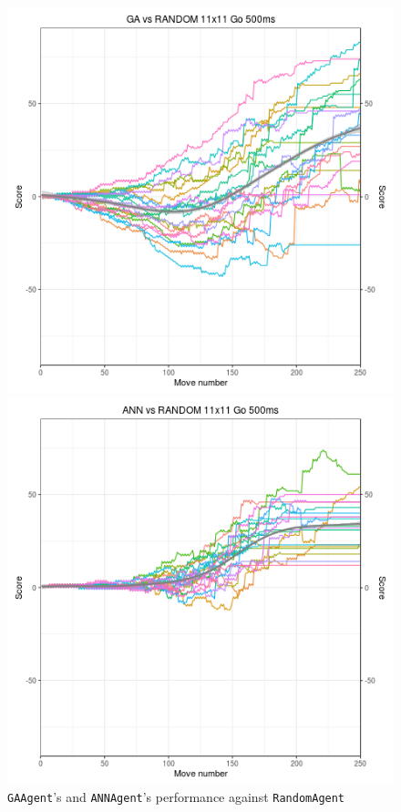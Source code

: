 \begin{figure}[h]
\centering
\begin{minipage}{.45\textwidth}
  \centering
  \includegraphics[scale=0.4]{images/Visualizations/GAvsRANDOM/500ms11x11.png}
\end{minipage}%
\begin{minipage}{.45\textwidth}
  \centering
  \includegraphics[scale=0.4]{images/Visualizations/ANNvsRANDOM/500ms11x11.png}
\end{minipage}
\caption{\texttt{GAAgent}'s and \texttt{ANNAgent}'s performance against \texttt{RandomAgent}}
\label{fig:rand}
\end{figure}

